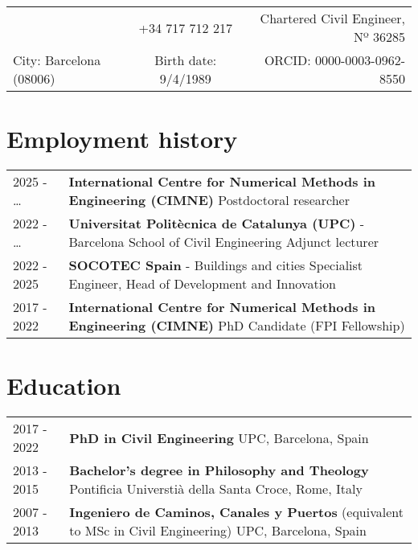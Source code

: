 \documentclass[12pt]{article}
\author{Miguel Masó, PhD}
\begin{document}
\maketitle
\begin{tabularx}{\linewidth}{lCr}
 &
+34 717 712 217 &
Chartered Civil Engineer, Nº 36285\\[-.2em]
City: Barcelona (08006) &
Birth date: 9/4/1989 &
ORCID: 0000-0003-0962-8550    
\end{tabularx}


\section{Employment history}
\begin{tabularx}{\linewidth}{lX}
    2025 - \enspace \dots &
    \textbf{International Centre for Numerical Methods in Engineering (CIMNE)} \newline
    Postdoctoral researcher \\

    2022 - \enspace \dots &
    \textbf{Universitat Politècnica de Catalunya (UPC)} - Barcelona School of Civil Engineering \newline
    Adjunct lecturer \\ 

    2022 - 2025 &
    \textbf{SOCOTEC Spain} - Buildings and cities \newline
    Specialist Engineer, Head of Development and Innovation \\

    2017 - 2022 &
    \textbf{International Centre for Numerical Methods in Engineering (CIMNE)} \newline
    PhD Candidate (FPI Fellowship) \\
\end{tabularx}


\section{Education}
\begin{tabularx}{\linewidth}{lX}
    2017 - 2022 &
    \textbf{PhD in Civil Engineering} \newline
    UPC, Barcelona, Spain \\

    2013 - 2015 &
    \textbf{Bachelor's degree in Philosophy and Theology} \newline
    Pontificia Universtià della Santa Croce, Rome, Italy \\

    2007 - 2013 &
    \textbf{Ingeniero de Caminos, Canales y Puertos} (equivalent to MSc in Civil Engineering) \newline
    UPC, Barcelona, Spain \\
\end{tabularx}
\end{document}
